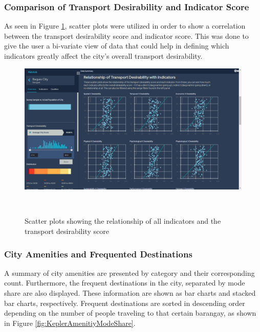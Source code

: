 \documentclass{sigchi}
\begin{document}
\subsubsection{Comparison of Transport Desirability and Indicator Score}
As seen in Figure \ref{fig:KeplerScatterPlot}, scatter plots were utilized in order to show a correlation between the transport desirability score and indicator score. This was done to give the user a bi-variate view of data that could help in defining which indicators greatly affect the city’s overall transport desirability.

\begin{figure}
\centering
  \includegraphics[width=0.9\columnwidth]{figures/overview-dsplot.PNG}
  \caption{Scatter plots showing the relationship of all indicators and the transport desirability score}~\label{fig:KeplerScatterPlot}
\end{figure}

\subsubsection{City Amenities and Frequented Destinations}
A summary of city amenities are presented by category and their corresponding count. Furthermore, the frequent destinations in the city, separated by mode share are also displayed. These information are shown as bar charts and stacked bar charts, respectively. Frequent destinations are sorted in descending order depending on the number of people traveling to that certain barangay, as shown in Figure \ref{fig:KeplerAmenitiyModeShare}.
\end{document}
